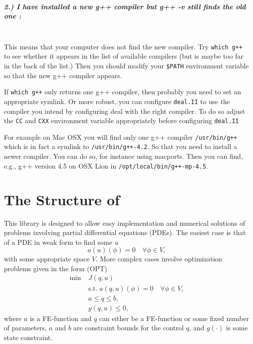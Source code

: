 \paragraph{2.) I have installed a new g++ compiler but g++ -v still finds the old one :}
\ \\
  This means that your computer does not find the new compiler. Try
  \texttt{which g++} to see whether it appears in the list of available 
  compilers (but is maybe too far in the back of the list.) Then you should 
  modify your \texttt{\$PATH} environment variable so that the new g++ compiler
  appears.

  If \texttt{which g++} only returns one g++ compiler, then probably you need to
  set an appropriate symlink. Or more robust, you can configure \texttt{deal.II}
  to use the compiler you intend by configuring deal with the right compiler. To
  do so adjust  the \texttt{CC} and \texttt{CXX} environment variable appropriately
  before configuring \texttt{deal.II}
  
  For example on Mac OSX you will find only one g++ compiler \texttt{/usr/bin/g++}
  which is in fact a symlink to \texttt{/usr/bin/g++-4.2}. 
  So that you need to install a newer compiler. You can do so, for instance
  using macports. Then you can find, e.g., g++ version 4.5 on OSX Lion 
  in \texttt{/opt/local/bin/g++-mp-4.5}. 


\chapter{The Structure of \dope{}}
This library is designed to allow easy implementation and numerical solutions 
of problems involving partial differential equations (PDEs). The easiest case 
is that of a PDE in weak form to find some $u$
\[
a(u)(\phi) = 0 \quad \forall \phi \in V,
\]
with some appropriate space $V$.
More complex cases involve optimization problems given in the form (OPT)
\begin{align*}
\min\;&J(q,u) \\
  &\text{s.t.}\; a(q,u)(\phi) = 0 \quad \forall \phi\in V,\\
  &a \le q \le b,\\
  &g(q,u) \le 0,  
\end{align*}
where $u$ is a FE-function and $q$ can either be a FE-function or some 
fixed number of parameters, $a$ and $b$ are constraint bounds for the control $q$,
and $g(\cdot)$ is some state constraint.


